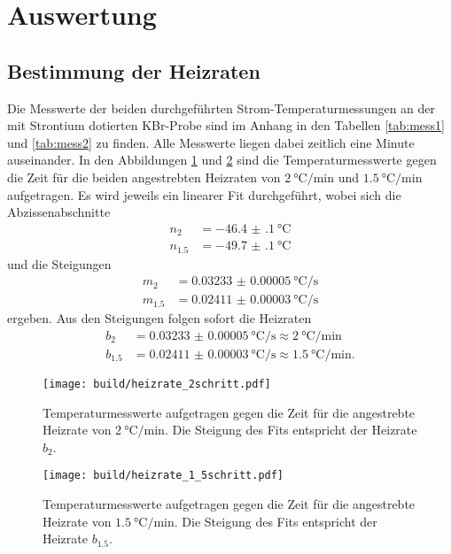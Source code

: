 \section{Auswertung}
\label{sec:Auswertung}

\subsection{Bestimmung der Heizraten}

Die Messwerte der beiden durchgeführten Strom-Temperaturmessungen an der mit
Strontium dotierten KBr-Probe sind im Anhang in den Tabellen \ref{tab:mess1}
und \ref{tab:mess2} zu finden. Alle Messwerte liegen dabei zeitlich eine Minute
auseinander. In den Abbildungen \ref{fig:heizrate2} und \ref{fig:heizrate15} sind
die Temperaturmesswerte gegen die Zeit für die beiden angestrebten Heizraten
von $\SI{2}{\celsius\per\minute}$ und $\SI{1.5}{\celsius\per\minute}$ aufgetragen.
Es wird jeweils ein linearer Fit durchgeführt, wobei sich die Abzissenabschnitte
\begin{align}
  n_{2} &= \SI{-46.4(1)}{\celsius}\\
  n_{1.5} &= \SI{-49.7(1)}{\celsius}
\end{align}
und die Steigungen
\begin{align}
  m_{2} &= \SI{0.03233(5)}{\celsius\per\second}\\
  m_{1.5} &= \SI{0.02411(3)}{\celsius\per\second}
\end{align}
ergeben. Aus den Steigungen folgen sofort die Heizraten
\begin{align}
  b_{2} &= \SI{0.03233(5)}{\celsius\per\second} \approx \SI{2}{\celsius\per\minute} \\
  b_{1.5} &= \SI{0.02411(3)}{\celsius\per\second} \approx \SI{1.5}{\celsius\per\minute}.
  \label{eqn:heizrate}
\end{align}

\begin{figure}
  \centering
  \texttt{[image: build/heizrate\_2schritt.pdf]}
  \caption{Temperaturmesswerte aufgetragen gegen die Zeit für die angestrebte Heizrate von $\SI{2}{\celsius\per\minute}$. Die Steigung
  des Fits entspricht der Heizrate $b_{2}$.}
  \label{fig:heizrate2}
\end{figure}

\begin{figure}
  \centering
  \texttt{[image: build/heizrate\_1\_5schritt.pdf]}
  \caption{Temperaturmesswerte aufgetragen gegen die Zeit für die angestrebte Heizrate von $\SI{1.5}{\celsius\per\minute}$. Die Steigung
  des Fits entspricht der Heizrate $b_{1.5}$.}
  \label{fig:heizrate15}
\end{figure}

